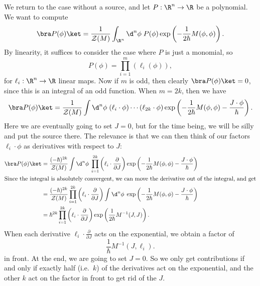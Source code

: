 \documentclass[a4paper]{article}
\begin{document}
We return to the case without a source, and let $P: \R^n \to \R$ be a polynomial. We want to compute
\[
  \bra P(\phi)\ket = \frac{1}{\mathcal{Z}(M)} \int_{\R^n} \d^n \phi\; P(\phi) \exp\left(-\frac{1}{2\hbar} M(\phi, \phi)\right).
\]
By linearity, it suffices to consider the case where $P$ is just a monomial, so
\[
  P(\phi) = \prod_{i = 1}^m (\ell_i(\phi)),
\]
for $\ell_i : \R^n \to \R$ linear maps. Now if $m$ is odd, then clearly $\bra P(\phi)\ket = 0$, since this is an integral of an odd function. When $m = 2k$, then we have
\[
  \bra P(\phi) \ket = \frac{1}{\mathcal{Z}(M)} \int \d^n \phi\; (\ell_i\cdot \phi) \cdots (\ell_{2k} \cdot \phi) \exp\left(-\frac{1}{2\hbar}M (\phi, \phi) - \frac{J \cdot \phi}{\hbar}\right).
\]
Here we are eventually going to set $J = 0$, but for the time being, we will be silly and put the source there. The relevance is that we can then think of our factors $\ell_i \cdot \phi$ as derivatives with respect to $J$:
\begin{align*}
  \bra P(\phi)\ket &= \frac{(-\hbar)^{2k}}{\mathcal{Z}(M)} \int \d^n \phi \; \prod_{i = 1}^{2k} \left(\ell_i \cdot \frac{\partial}{\partial J}\right) \exp\left(-\frac{1}{2\hbar} M(\phi, \phi) - \frac{J\cdot \phi}{\hbar}\right)\\
  \intertext{Since the integral is absolutely convergent, we can move the derivative out of the integral, and get}
  &= \frac{(-\hbar)^{2k}}{\mathcal{Z}(M)} \prod_{i = 1}^{2k} \left(\ell_i \cdot \frac{\partial}{\partial J}\right) \int \d^n \phi \; \exp\left(-\frac{1}{2\hbar} M(\phi, \phi) - \frac{J\cdot \phi}{\hbar}\right)\\
  &= \hbar^{2k} \prod_{i = 1}^{2k} \left(\ell_i \cdot \frac{\partial}{\partial J}\right) \exp\left(\frac{1}{2\hbar}M^{-1}(J, J)\right).
\end{align*}
When each derivative $\ell_i \cdot \frac{\partial}{\partial J}$ acts on the exponential, we obtain a factor of
\[
  \frac{1}{\hbar} M^{-1}(J, \ell_i).
\]
in front. At the end, we are going to set $J = 0$. So we only get contributions if and only if exactly half (i.e.\ $k$) of the derivatives act on the exponential, and the other $k$ act on the factor in front to get rid of the $J$.
\end{document}
